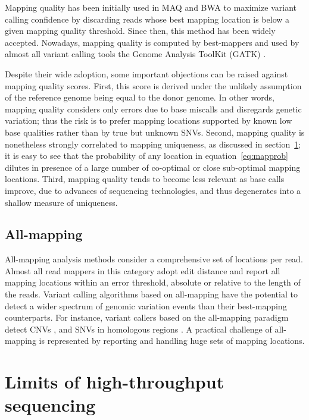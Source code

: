 Mapping quality has been initially used in MAQ \citep{Li2008} and BWA \citep{Li2009} to maximize variant calling confidence by discarding reads whose best mapping location is below a given mapping quality threshold.
Since then, this method has been widely accepted.
Nowadays, mapping quality is computed by best-mappers and used by almost all variant calling tools \eg the Genome Analysis ToolKit (GATK) \citep{DePristo2011}.

Despite their wide adoption, some important objections can be raised against mapping quality scores.
First, this score is derived under the unlikely assumption of the reference genome being equal to the donor genome.
In other words, mapping quality considers only errors due to base miscalls and disregards genetic variation; thus the risk is to prefer mapping locations supported by known low base qualities rather than by true but unknown SNVs.
Second, mapping quality is nonetheless strongly correlated to mapping uniqueness, as discussed in section~\ref{sec:mappability}; it is easy to see that the probability of any location in equation~\ref{eq:mapprob} dilutes in presence of a large number of co-optimal or close sub-optimal mapping locations.
Third, mapping quality tends to become less relevant as base calls improve, due to advances of sequencing technologies, and thus degenerates into a shallow measure of uniqueness.

\subsection{All-mapping}
All-mapping analysis methods consider a comprehensive set of locations per read.
Almost all read mappers in this category adopt edit distance and report all mapping locations within an error threshold, absolute or relative \wrt to the length of the reads.
Variant calling algorithms based on all-mapping have the potential to detect a wider spectrum of genomic variation events than their best-mapping counterparts.
For instance, variant callers based on the all-mapping paradigm detect CNVs \citep{Alkan2009}, and SNVs in homologous regions \citep{Simola2011}.
A practical challenge of all-mapping is represented by reporting and handling huge sets of mapping locations.


\section{Limits of high-throughput sequencing}
\label{sec:mappability}


